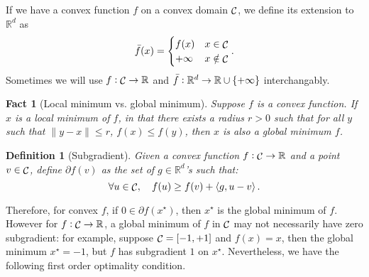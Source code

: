 \documentclass{article}
\newtheorem{definition}{Definition}
\newtheorem{fact}{Fact}
\DeclareMathOperator*{\Ccal}{{\cal C}}
\newcommand{\RR}{\mathbb{R}} %
\newcommand{\inner}[2]{\left\langle #1,#2 \right\rangle}
\begin{document}
If we have a convex function $f$ on a convex domain $\Ccal$, we define its extension to $\RR^d$ as
\begin{equation}
   \bar{f}(x) = \begin{cases} f(x) & x \in \Ccal \\ +\infty & x \notin \Ccal \end{cases}.
   \label{eqn:extend-rd}
 \end{equation}
Sometimes we will use $f: \Ccal \to \RR$ and $\bar{f}: \RR^d \to \RR \cup \cbr{+\infty}$ interchangably.


\begin{fact}[Local minimum vs. global minimum]
Suppose $f$ is a convex function. If $x$ is a local minimum of $f$, in that there exists a radius $r > 0$ such that for all $y$ such that $\| y - x\| \leq r$, $f(x) \leq f(y)$, then $x$ is also a global minimum $f$.
\end{fact}

\begin{definition}[Subgradient]
Given a convex function $f: \Ccal \to \RR$ and a point $v \in \Ccal$, define $\partial f(v)$ as the set of $g \in \RR^d$'s such that:
\[ \forall u \in \Ccal, \quad f(u) \geq f(v) + \inner{g}{u - v}. \]
\end{definition}

Therefore, for convex $f$, if $0 \in \partial f(x^\star)$, then $x^\star$ is the global minimum of $f$. However for $f: \Ccal \to \RR$, a global minimum of $f$ in $\Ccal$ may not necessarily have zero subgradient: for example, suppose $\Ccal = [-1,+1]$ and $f(x) = x$, then the global minimum $x^\star = -1$, but $f$ has subgradient $1$ on $x^\star$. Nevertheless, we have the following first order optimality condition.
\end{document}
